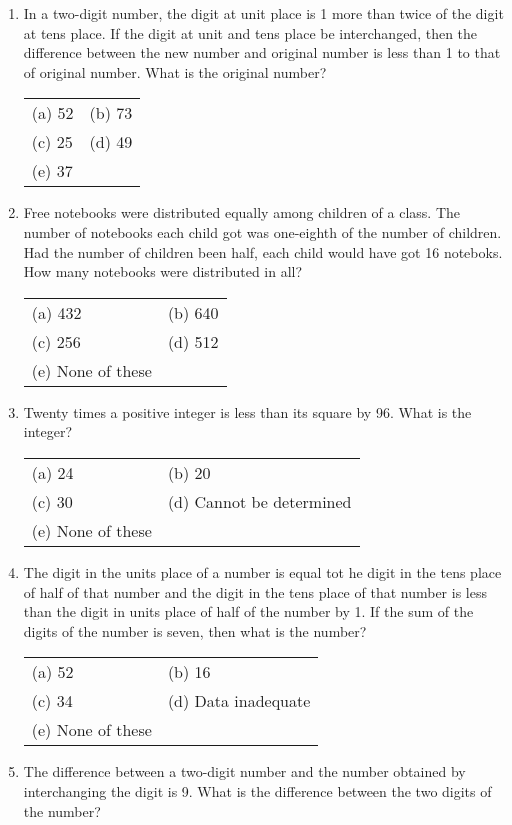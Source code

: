 \begin{multicols}{2}
\begin{enumerate}[leftmargin=*]
\item In a two-digit number, the digit at unit place is 1 more than twice of the digit at tens place. If the digit at unit and tens place be interchanged, then the difference between the new number and original number is less than 1 to that of original number. What is the original number?

\begin{tabular}{l@{\qquad\quad}l}
(a) 52 & (b) 73 \\
(c) 25 & (d) 49 \\
(e) 37
\end{tabular}

\item Free notebooks were distributed equally among children of a class. The number of notebooks each child got was one-eighth of the number of children. Had the number of children been half, each child would have got 16 noteboks. How many notebooks were distributed in all?

\begin{tabular}{l@{\qquad\quad}l}
(a) 432 & (b) 640 \\
(c) 256 & (d)  512 \\
(e) None of these
\end{tabular}

\item Twenty times a positive integer is less than its square by 96. What is the integer?

\begin{tabular}{l@{\qquad\quad}l}
(a) 24 & (b) 20 \\
(c) 30 & (d) Cannot be determined\\
(e) None of these
\end{tabular}

\item The digit in the units place of a number is equal tot he digit in the tens place of half of that number and the digit in the tens place of that number is less than the digit in units place of half of the number by 1. If the sum of the digits of the number is seven, then what is the number?

\begin{tabular}{l@{\qquad\quad}l}
(a) 52 & (b) 16 \\
(c) 34 & (d) Data inadequate \\
(e) None of these
\end{tabular}

\item The difference between a two-digit number and the number obtained by interchanging the digit is 9. What is the difference between the two digits of the number?


\end{enumerate}
\end{multicols}
